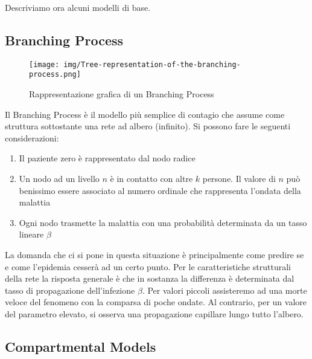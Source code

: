 \documentclass[12pt,twoside]{report}
\begin{document}
    Descriviamo ora alcuni modelli di base.
    
\subsection{Branching Process}
\vskip 20pt
	\begin{figure}[htb]
		\centering
		\texttt{[image: img/Tree-representation-of-the-branching-process.png]}
		\caption{Rappresentazione grafica di un Branching Process}\label{fig:1}
	\end{figure}
	\vskip 20pt
    Il Branching Process è il modello più semplice di contagio che assume come struttura sottostante una rete ad albero (infinito). Si possono fare le seguenti considerazioni:
    
    \begin{enumerate}
        \item Il paziente zero è rappresentato dal nodo radice
        \item Un nodo ad un livello $n$ è in contatto con altre $k$ persone. Il valore di $n$ può benissimo essere associato al numero ordinale che rappresenta l'ondata della malattia
        \item Ogni nodo trasmette la malattia con una probabilità determinata da un tasso lineare $\beta$
    \end{enumerate}
    
    La domanda che ci si pone in questa situazione è principalmente come predire se e come l'epidemia cesserà ad un certo punto. Per le caratteristiche strutturali della rete la risposta generale è che in sostanza la differenza è determinata dal tasso di propagazione dell'infezione $\beta$. Per valori piccoli assisteremo ad una morte veloce del fenomeno con la comparsa di poche ondate. Al contrario, per un valore del parametro elevato, si osserva una propagazione capillare lungo tutto l'albero.

\subsection{Compartmental Models}
\end{document}
